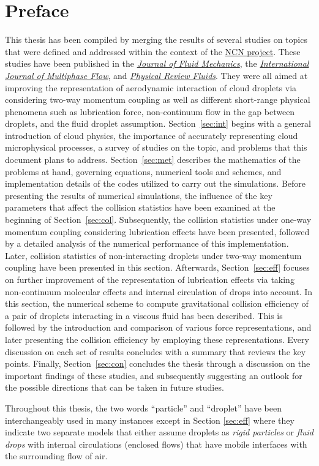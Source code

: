 \documentclass[../thesis.tex]{subfiles}
\begin{document}
\section*{Preface\label{sec:pre}}

This thesis has been compiled by merging the results of several studies on topics that were defined and addressed within the context of the \href{https://projekty.ncn.gov.pl/en/index.php?projekt_id=417540}{NCN project}. These studies have been published in the \href{https://doi.org/10.1017/jfm.2021.229}{\emph{Journal of Fluid Mechanics}}, the \href{https://doi.org/10.1016/j.ijmultiphaseflow.2021.103906}{\emph{International Journal of Multiphase Flow}}, and \href{https://doi.org/10.1103/PhysRevFluids.8.014102}{\emph{Physical Review Fluids}}. They were all aimed at improving the representation of aerodynamic interaction of cloud droplets via considering two-way momentum coupling as well as different short-range physical phenomena such as lubrication force, non-continuum flow in the gap between droplets, and the fluid droplet assumption. Section~\ref{sec:int} begins with a general introduction of cloud physics, the importance of accurately representing cloud microphysical processes, a survey of studies on the topic, and problems that this document plans to address. Section~\ref{sec:met} describes the mathematics of the problems at hand, governing equations, numerical tools and schemes, and implementation details of the codes utilized to carry out the simulations. Before presenting the results of numerical simulations, the influence of the key parameters that affect the collision statistics have been examined at the beginning of Section~\ref{sec:col}. Subsequently, the collision statistics under one-way momentum coupling considering lubrication effects have been presented, followed by a detailed analysis of the numerical performance of this implementation. Later, collision statistics of non-interacting droplets under two-way momentum coupling have been presented in this section. Afterwards, Section~\ref{sec:eff} focuses on further improvement of the representation of lubrication effects via taking non-continuum molecular effects and internal circulation of drops into account. In this section, the numerical scheme to compute gravitational collision efficiency of a pair of droplets interacting in a viscous fluid has been described. This is followed by the introduction and comparison of various force representations, and later presenting the collision efficiency by employing these representations. Every discussion on each set of results concludes with a summary that reviews the key points. Finally, Section~\ref{sec:con} concludes the thesis through a discussion on the important findings of these studies, and subsequently suggesting an outlook for the possible directions that can be taken in future studies.

Throughout this thesis, the two words ``particle'' and ``droplet'' have been interchangeably used in many instances except in Section \ref{sec:eff} where they indicate two separate models that either assume droplets as \emph{rigid particles} or \emph{fluid drops} with internal circulations (enclosed flows) that have mobile interfaces with the surrounding flow of air.

\newpage
\end{document}
